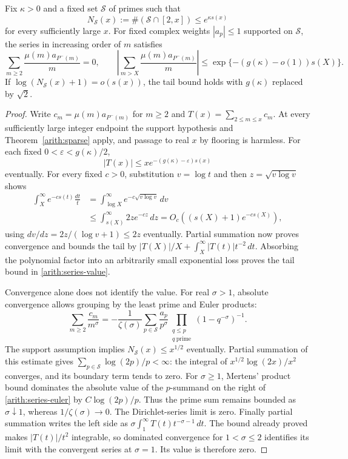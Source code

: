 \begin{theorem}\label{arith:thin-series}
Fix $\kappa>0$ and a fixed set $\mathcal S$ of primes such that
\[
 N_{\mathcal S}(x):=\#(\mathcal S\cap[2,x])\le e^{\kappa s(x)}
\]
for every sufficiently large $x$. For fixed complex weights $|a_p|\le1$
supported on $\mathcal S$, the series in increasing order of $m$ satisfies
\begin{equation}\label{arith:series-value}
 \sum_{m\ge2}\frac{\mu(m)a_{P^-(m)}}m=0,
 \qquad
 \left|\sum_{m>X}\frac{\mu(m)a_{P^-(m)}}m\right|
 \le\exp\{-(g(\kappa)-o(1))s(X)\}.
\end{equation}
If $\log(N_{\mathcal S}(x)+1)=o(s(x))$, the tail bound holds with
$g(\kappa)$ replaced by $\sqrt2$.
\end{theorem}
\begin{proof}
Write $c_m=\mu(m)a_{P^-(m)}$ for $m\ge2$ and
$T(x)=\sum_{2\le m\le x}c_m$.
At every sufficiently large integer endpoint the support hypothesis and
Theorem~\ref{arith:sparse} apply, and passage to real $x$ by flooring
is harmless. For each fixed $0<\varepsilon<g(\kappa)/2$,
\[
 |T(x)|\le x e^{-(g(\kappa)-\varepsilon)s(x)}
\]
eventually. For every fixed $c>0$, substitution $v=\log t$ and then
$z=\sqrt{v\log v}$ shows
\begin{align*}
 \int_X^\infty e^{-cs(t)}\frac{dt}{t}
 &=\int_{\log X}^\infty e^{-c\sqrt{v\log v}}\,dv\\
 &\le\int_{s(X)}^\infty 2z e^{-cz}\,dz
 =O_c((s(X)+1)e^{-cs(X)}),
\end{align*}
using $dv/dz=2z/(\log v+1)\le2z$ eventually.
Partial summation now proves convergence and bounds the tail by
$|T(X)|/X+\int_X^\infty|T(t)|t^{-2}\,dt$.
Absorbing the polynomial factor into an arbitrarily small exponential
loss proves the tail bound in \eqref{arith:series-value}.

Convergence alone does not identify the value. For real $\sigma>1$,
absolute convergence allows grouping by the least prime and Euler products:
\begin{equation}\label{arith:series-euler}
 \sum_{m\ge2}\frac{c_m}{m^\sigma}
 =-\frac1{\zeta(\sigma)}
   \sum_{p\in\mathcal S}\frac{a_p}{p^\sigma}
      \prod_{\substack{q\le p\\q\ \mathrm{prime}}}(1-q^{-\sigma})^{-1}.
\end{equation}
The support assumption implies $N_{\mathcal S}(x)\le x^{1/2}$
eventually. Partial summation of this estimate gives
$\sum_{p\in\mathcal S}\log(2p)/p<\infty$: the integral of
$x^{1/2}\log(2x)/x^2$ converges, and its boundary term tends to zero.
For $\sigma\ge1$, Mertens' product bound dominates the absolute value
of the $p$-summand on the right of \eqref{arith:series-euler} by
$C\log(2p)/p$. Thus the prime sum remains bounded as
$\sigma\downarrow1$, whereas $1/\zeta(\sigma)\to0$.
The Dirichlet-series limit is zero. Finally partial summation writes the
left side as
$\sigma\int_1^\infty T(t)t^{-\sigma-1}\,dt$.
The bound already proved makes $|T(t)|/t^2$ integrable, so dominated
convergence for $1<\sigma\le2$ identifies its limit with the convergent
series at $\sigma=1$. Its value is therefore zero.


\end{proof}
